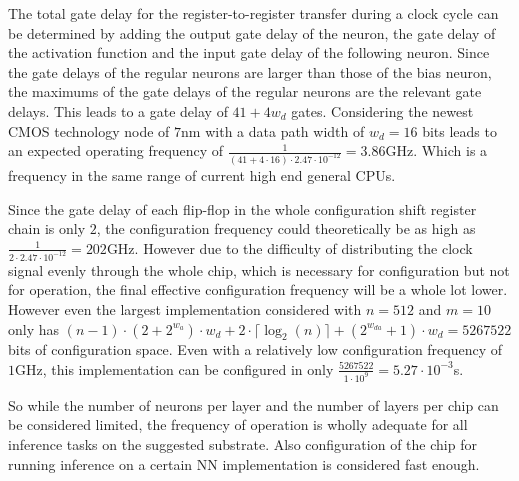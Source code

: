 The total gate delay for the register-to-register transfer during a clock cycle can be determined by adding the output gate delay of the neuron, the gate delay of the activation function and the input gate delay of the following neuron. Since the gate delays of the regular neurons are larger than those of the bias neuron, the maximums of the gate delays of the regular neurons are the relevant gate delays. This leads to a gate delay of $41 + 4w_{d}$ gates. Considering the newest \ac{CMOS} technology node of $7$nm\cite{STILLMAKER201774} with a data path width of $w_{d} = 16$ bits leads to an expected operating frequency of $\frac{1}{(41 + 4 \cdot 16) \cdot 2.47 \cdot 10^{-12}} = 3.86$GHz. Which is a frequency in the same range of current high end general \acp{CPU}.

Since the gate delay of each flip-flop in the whole configuration shift register chain is only $2$, the configuration frequency could theoretically be as high as $\frac{1}{2 \cdot 2.47 \cdot 10^{-12}} = 202$GHz. However due to the difficulty of distributing the clock signal evenly through the whole chip, which is necessary for configuration but not for operation, the final effective configuration frequency will be a whole lot lower. However even the largest implementation considered with $n = 512$ and $m = 10$ only has $(n - 1) \cdot (2 + 2^{w_{a}}) \cdot w_{d} + 2 \cdot \lceil\log_{2}(n)\rceil + (2^{w_{da}} + 1) \cdot w_{d} = 5267522$ bits of configuration space. Even with a relatively low configuration frequency of $1$GHz, this implementation can be configured in only $\frac{5267522}{1 \cdot 10^{9}} = 5.27 \cdot 10^{-3}$s.

So while the number of neurons per layer and the number of layers per chip can be considered limited, the frequency of operation is wholly adequate for all inference tasks on the suggested substrate. Also configuration of the chip for running inference on a certain \ac{NN} implementation is considered fast enough.
